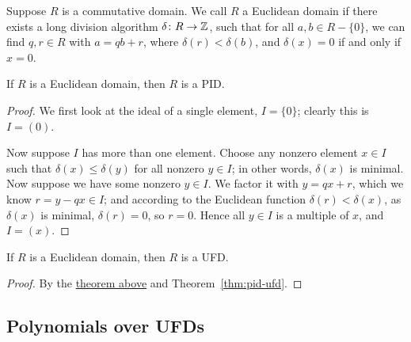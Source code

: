 \begin{definition}
    Suppose \(R\) is a commutative domain.
    We call \(R\) a Euclidean domain if there exists a long division algorithm
    \(\delta\colon R\to\mathbb{Z}\),
    such that for all \(a,b \in R - \{0\}\),
    we can find \(q,r \in R\) with \(a = qb + r\),
    where \(\delta(r) < \delta(b)\),
    and \(\delta(x) = 0\) if and only if \(x = 0\).
\end{definition}
\begin{theorem}\label{thm:euclidean-pid}
    If \(R\) is a Euclidean domain,
    then \(R\) is a PID.\@
\end{theorem}
\begin{proof}
    We first look at the ideal of a single element, \(I = \{0\}\);
    clearly this is \(I = (0)\).

    Now suppose \(I\) has more than one element.
    Choose any nonzero element \(x \in I\)
    such that \(\delta(x) \leq \delta(y)\) for all nonzero \(y \in I\);
    in other words, \(\delta(x)\) is minimal.
    Now suppose we have some nonzero \(y \in I\).
    We factor it with \(y = qx + r\),
    which we know \(r = y - qx \in I\);
    and according to the Euclidean function \(\delta(r) < \delta(x)\),
    as \(\delta(x)\) is minimal, \(\delta(r) = 0\), so \(r = 0\).
    Hence all \(y \in I\) is a multiple of \(x\),
    and \(I = (x)\).
\end{proof}
\begin{corollary}\label{cor:euclidean-ufd}
    If \(R\) is a Euclidean domain,
    then \(R\) is a UFD.\@
\end{corollary}
\begin{proof}
    By the \hyperref[thm:euclidean-pid]{theorem above}
    and Theorem~\ref{thm:pid-ufd}.
\end{proof}

\subsection*{Polynomials over UFDs}

